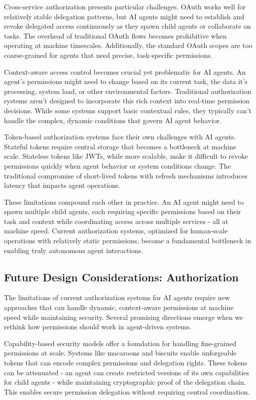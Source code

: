 \documentclass{article}
\begin{document}
Cross-service authorization presents particular challenges. OAuth works well for relatively stable delegation patterns, but AI agents might need to establish and revoke delegated access continuously as they spawn child agents or collaborate on tasks. The overhead of traditional OAuth flows becomes prohibitive when operating at machine timescales. Additionally, the standard OAuth scopes are too coarse-grained for agents that need precise, task-specific permissions.

Context-aware access control becomes crucial yet problematic for AI agents. An agent's permissions might need to change based on its current task, the data it's processing, system load, or other environmental factors. Traditional authorization systems aren't designed to incorporate this rich context into real-time permission decisions. While some systems support basic contextual rules, they typically can't handle the complex, dynamic conditions that govern AI agent behavior.

Token-based authorization systems face their own challenges with AI agents. Stateful tokens require central storage that becomes a bottleneck at machine scale. Stateless tokens like JWTs, while more scalable, make it difficult to revoke permissions quickly when agent behavior or system conditions change. The traditional compromise of short-lived tokens with refresh mechanisms introduces latency that impacts agent operations.

These limitations compound each other in practice. An AI agent might need to spawn multiple child agents, each requiring specific permissions based on their task and context while coordinating access across multiple services - all at machine speed. Current authorization systems, optimized for human-scale operations with relatively static permissions, become a fundamental bottleneck in enabling truly autonomous agent interactions.

\subsection{Future Design Considerations: Authorization}
\label{subsec:authorization_future}
The limitations of current authorization systems for AI agents require new approaches that can handle dynamic, context-aware permissions at machine speed while maintaining security. Several promising directions emerge when we rethink how permissions should work in agent-driven systems.

Capability-based security models offer a foundation for handling fine-grained permissions at scale. Systems like macaroons and biscuits enable unforgeable tokens that can encode complex permissions and delegation rights. These tokens can be attenuated - an agent can create restricted versions of its own capabilities for child agents - while maintaining cryptographic proof of the delegation chain. This enables secure permission delegation without requiring central coordination.
\end{document}
